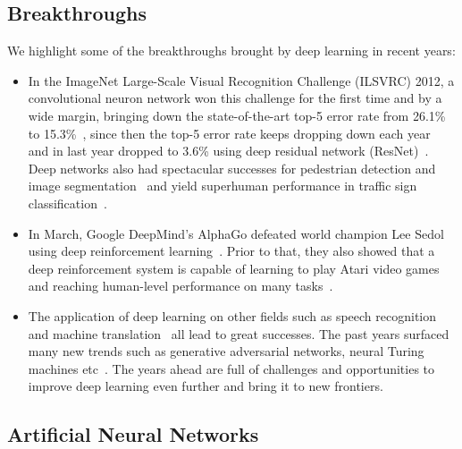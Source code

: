 \subsection{Breakthroughs}
We highlight some of the breakthroughs brought by deep learning in recent years:
\begin{itemize}
\item In the ImageNet Large-Scale Visual Recognition Challenge (ILSVRC) 2012, a convolutional neuron network won this challenge for the first time and by a wide margin, bringing down the state-of-the-art top-5 error rate from 26.1\% to 15.3\%~\cite{krizhevsky2012imagenet}, since then the top-5 error rate keeps dropping down each year~\cite{SimonyanZ14a, szegedy2015going} and in last year dropped to 3.6\% using deep residual network (ResNet)~\cite{kmhresnet15}. Deep networks also had spectacular successes for pedestrian detection and image segmentation~\cite{sermanet2013pedestrian,farabet2013learning,couprie2013indoor} and yield superhuman performance in traffic sign classification~\cite{cirecsan2012multi}.
\item In March, Google DeepMind's AlphaGo defeated world champion Lee Sedol using deep reinforcement learning~\cite{silver2016mastering,links:alphagovslee}. Prior to that, they also showed that a deep reinforcement system is capable of learning to play Atari video games and reaching human-level performance on many tasks~\cite{mnih2013playing}.
\item The application of deep learning on other fields such as speech recognition~\cite{dahl2010phone, deng2010binary, hinton2012deep} and machine translation~\cite{sutskever2014sequence, bahdanau2014neural} all lead to great successes. The past years surfaced many new trends such as generative adversarial networks, neural Turing machines etc~\cite{goodfellow2014generative, radford2015unsupervised, graves2014neural, xu2015show, links:olah2016attention}. The years ahead are full of challenges and opportunities to improve deep learning even further and bring it to new frontiers.
\end{itemize}



\subsection{Artificial Neural Networks}

